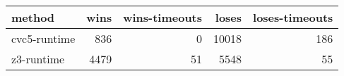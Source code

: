 \begin{tabular}{lrrrr}
\hline
 method       &   wins &   wins-timeouts &   loses &   loses-timeouts \\
\hline
 cvc5-runtime &    836 &               0 &   10018 &              186 \\
 z3-runtime   &   4479 &              51 &    5548 &               55 \\
\hline
\end{tabular}
